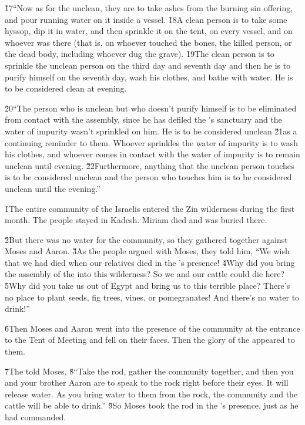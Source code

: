 \v{17}``Now as for the unclean, they are to take ashes from the burning sin offering, and pour running water on it inside a vessel. \v{18}A clean person is to take some hyssop, dip it in water, and then sprinkle it on the tent, on every vessel, and on whoever was there (that is, on whoever touched the bones, the killed person, or the dead body, including whoever dug the grave). \v{19}The clean person is to sprinkle the unclean person on the third day and seventh day and then he is to purify himself on the seventh day, wash his clothes, and bathe with water. He is to be considered clean at evening.

\v{20}``The person who is unclean but who doesn't purify himself is to be eliminated from contact with the assembly, since he has defiled the 's sanctuary and the water of impurity wasn't sprinkled on him. He is to be considered unclean \v{21}as a continuing reminder to them. Whoever sprinkles the water of impurity is to wash his clothes, and whoever comes in contact with the water of impurity is to remain unclean until evening. \v{22}Furthermore, anything that the unclean person touches is to be considered unclean and the person who touches him is to be considered unclean until the evening.''

\v{1}The entire community of the Israelis entered the Zin wilderness during the first month. The people stayed in Kadesh. Miriam died and was buried there.

\v{2}But there was no water for the community, so they gathered together against Moses and Aaron. \v{3}As the people argued with Moses, they told him, ``We wish that we had died when our relatives died in the 's presence! \v{4}Why did you bring the assembly of the  into this wilderness? So we and our cattle could die here? \v{5}Why did you take us out of Egypt and bring us to this terrible place? There's no place to plant seeds, fig trees, vines, or pomegranates! And there's no water to drink!''

\v{6}Then Moses and Aaron went into the presence of the community at the entrance to the Tent of Meeting and fell on their faces. Then the glory of the  appeared to them.

\v{7}The  told Moses, \v{8}``Take the rod, gather the community together, and then you and your brother Aaron are to speak to the rock right before their eyes. It will release water. As you bring water to them from the rock, the community and the cattle will be able to drink.'' \v{9}So Moses took the rod in the 's presence, just as he had commanded.

